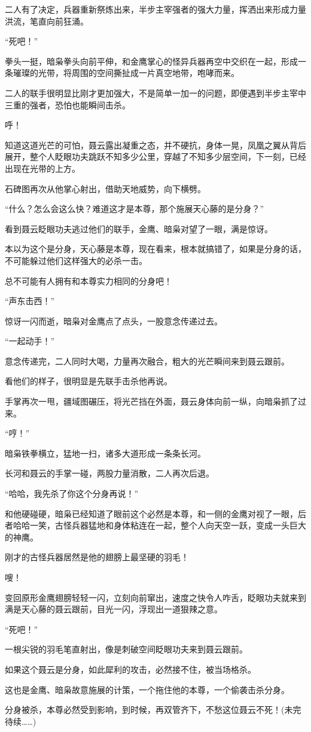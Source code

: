 \begin{this_body}
二人有了决定，兵器重新祭炼出来，半步主宰强者的强大力量，挥洒出来形成力量洪流，笔直向前狂涌。

“死吧！”

拳头一挺，暗枭拳头向前平伸，和金鹰掌心的怪异兵器再空中交织在一起，形成一条璀璨的光带，将周围的空间撕扯成一片真空地带，咆哮而来。

二人的联手很明显比刚才更加强大，不是简单一加一的问题，即便遇到半步主宰中三重的强者，恐怕也能瞬间击杀。

呼！

知道这道光芒的可怕，聂云露出凝重之态，并不硬抗，身体一晃，凤凰之翼从背后展开，整个人眨眼功夫跳跃不知多少公里，穿越了不知多少层空间，下一刻，已经出现在光带的上方。

石碑图再次从他掌心射出，借助天地威势，向下横劈。

“什么？怎么会这么快？难道这才是本尊，那个施展天心藤的是分身？”

看到聂云眨眼功夫逃过他们的联手，金鹰、暗枭对望了一眼，满是惊讶。

本以为这个是分身，天心藤是本尊，现在看来，根本就搞错了，如果是分身的话，不可能躲过他们这样强大的必杀一击。

总不可能有人拥有和本尊实力相同的分身吧！

“声东击西！”

惊讶一闪而逝，暗枭对金鹰点了点头，一股意念传递过去。

“一起动手！”

意念传递完，二人同时大喝，力量再次融合，粗大的光芒瞬间来到聂云跟前。

看他们的样子，很明显是先联手击杀他再说。

手掌再次一甩，疆域图碾压，将光芒挡在外面，聂云身体向前一纵，向暗枭抓了过来。

“哼！”

暗枭铁拳横立，猛地一扫，诸多大道形成一条条长河。

长河和聂云的手掌一碰，两股力量消散，二人再次后退。

“哈哈，我先杀了你这个分身再说！”

和他硬碰硬，暗枭已经知道了眼前这个必然是本尊，和一侧的金鹰对视了一眼，后者哈哈一笑，古怪兵器猛地和身体粘连在一起，整个人向天空一跃，变成一头巨大的神鹰。

刚才的古怪兵器居然是他的翅膀上最坚硬的羽毛！

嗖！

变回原形金鹰翅膀轻轻一闪，立刻向前窜出，速度之快令人咋舌，眨眼功夫就来到满是天心藤的聂云跟前，目光一闪，浮现出一道狠辣之意。

“死吧！”

一根尖锐的羽毛笔直射出，像是刺破空间眨眼功夫来到聂云跟前。

如果这个聂云是分身，如此犀利的攻击，必然接不住，被当场格杀。

这也是金鹰、暗枭故意施展的计策，一个拖住他的本尊，一个偷袭击杀分身。

分身被杀，本尊必然受到影响，到时候，再双管齐下，不愁这位聂云不死！(未完待续……)

\end{this_body}

